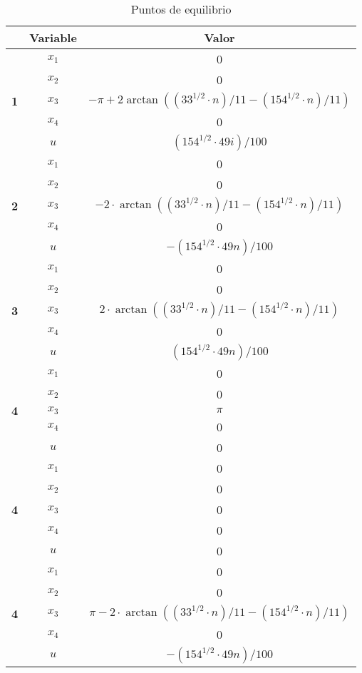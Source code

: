 \documentclass{ieeeaccess}
\begin{document}
\begin{table}[ht!]
  \centering
  \caption{Puntos de equilibrio}\label{tab: ptoseq}
  \begin{tabular}{|c|c|c|}
    \hline
    \textbf{} & \textbf{Variable} & \textbf{Valor}\\
    \hline
    \multirow{5}{*}{\textbf{1}} & $x_1$ & 0\\
    & $x_2$ & 0\\
    & $x_3$ & $- \pi + 2\arctan((33^{1/2}\cdot n)/11 - (154^{1/2}\cdot n)/11)$\\
    & $x_4$ & 0\\
    & $u$ & $(154^{1/2}\cdot 49i)/100$\\
    \hline
    \multirow{5}{*}{\textbf{2}} & $x_1$ & 0\\
    & $x_2$ & 0\\
    & $x_3$ & $-2\cdot\arctan((33^{1/2}\cdot n)/11 - (154^{1/2}\cdot n)/11)$\\
    & $x_4$ & 0\\
    & $u$ & $-(154^{1/2}\cdot 49n)/100$\\
    \hline
    \multirow{5}{*}{\textbf{3}} & $x_1$ & 0\\
    & $x_2$ & 0\\
    & $x_3$ & $2\cdot\arctan((33^{1/2}\cdot n)/11 - (154^{1/2}\cdot n)/11)$\\
    & $x_4$ & 0\\
    & $u$ & $(154^{1/2}\cdot 49n)/100$\\
    \hline
    \multirow{5}{*}{\textbf{4}} & $x_1$ & 0\\
    & $x_2$ & 0\\
    & $x_3$ & $\pi$\\
    & $x_4$ & 0\\
    & $u$ & 0\\
    \hline
    \multirow{5}{*}{\textbf{4}} & $x_1$ & 0\\
    & $x_2$ & 0\\
    & $x_3$ & 0\\
    & $x_4$ & 0\\
    & $u$ & 0\\
    \hline
    \multirow{5}{*}{\textbf{4}} & $x_1$ & 0\\
    & $x_2$ & 0\\
    & $x_3$ & $\pi - 2\cdot\arctan((33^{1/2}\cdot n)/11
              - (154^{1/2}\cdot n)/11)$\\
    & $x_4$ & 0\\
    & $u$ & $-(154^{1/2}\cdot 49n)/100$\\
    \hline
\end{tabular}
\end{table}
\end{document}

